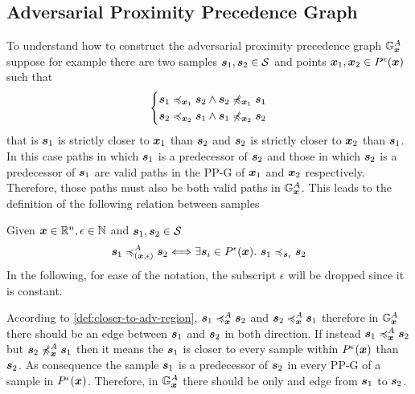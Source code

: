 \subsection{Adversarial Proximity Precedence Graph}
\label{subsec:app-g}

To understand how to construct the adversarial proximity precedence graph $\APPG$ suppose for example there are two samples $\sample[1], \sample[2] \in \set$ and points $\x[1], \x[2] \in \pert$ such that
\begin{equation*}
  \begin{cases*}
    \sample[1] \preccurlyeq_{\x[1]} \sample[2] \wedge \sample[2] \not\preccurlyeq_{\x[1]} \sample[1] \\
    \sample[2] \preccurlyeq_{\x[2]} \sample[1] \wedge \sample[1] \not\preccurlyeq_{\x[2]} \sample[2]
  \end{cases*}
\end{equation*}
that is $\sample[1]$ is strictly closer to $\x[1]$ than $\sample[2]$ and  $\sample[2]$ is strictly closer to $\x[2]$ than $\sample[1]$. In this case paths in which $\sample[1]$ is a predecessor of $\sample[2]$ and those in which $\sample[2]$ is a predecessor of $\sample[1]$ are valid paths in the \acs{PP-G} of $\x[1]$ and $\x[2]$ respectively. Therefore, those paths must also be both valid paths in $\APPG$. This leads to the definition of the following relation between samples

\begin{definition}
\label{def:closer-to-adv-region}
Given $\vinput \in \R, \epsilon \in \N$ and $\sample[1], \sample[2] \in \set$
\[
  \sample[1] \preccurlyeq^A_{(\vinput, \epsilon)} \sample[2] \Longleftrightarrow \exists \sample \in \pert.\  \sample[1] \preccurlyeq_{\sample} \sample[2]
\]
In the following, for ease of the notation, the subscript $\epsilon$ will be dropped since it is constant.
\end{definition}

\noindent According to \autoref{def:closer-to-adv-region}, $\apre{\sample[1]}{\sample[2]}$ and $\apre{\sample[2]}{\sample[1]}$ therefore in $\APPG$ there should be an edge between $\sample[1]$ and $\sample[2]$ in both direction. If instead  $\apre{\sample[1]}{\sample[2]}$ but $\napre{\sample[2]}{\sample[1]}$ then it means the $\sample[1]$ is closer to every sample within $\pert$ than $\sample[2]$. As consequence the sample $\sample[1]$ is a predecessor of $\sample[2]$ in every \acs{PP-G} of a sample in $\pert$. Therefore, in $\APPG$ there should be only and edge from $\sample[1]$ to $\sample[2]$.


